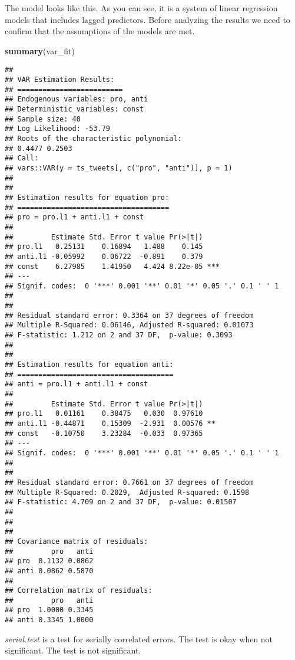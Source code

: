 \documentclass[
]{article}
\newenvironment{Shaded}{\begin{snugshade}}{\end{snugshade}}
\newcommand{\FunctionTok}[1]{\textcolor[rgb]{0.13,0.29,0.53}{\textbf{#1}}}
\newcommand{\NormalTok}[1]{#1}
\begin{document}
The model looks like this. As you can see, it is a system of linear regression models that includes lagged predictors. Before analyzing the results we need to confirm that the assumptions of the models are met.

\begin{Shaded}
\begin{Highlighting}[]
\FunctionTok{summary}\NormalTok{(var\_fit)}
\end{Highlighting}
\end{Shaded}

\begin{verbatim}
## 
## VAR Estimation Results:
## ========================= 
## Endogenous variables: pro, anti 
## Deterministic variables: const 
## Sample size: 40 
## Log Likelihood: -53.79 
## Roots of the characteristic polynomial:
## 0.4477 0.2503
## Call:
## vars::VAR(y = ts_tweets[, c("pro", "anti")], p = 1)
## 
## 
## Estimation results for equation pro: 
## ==================================== 
## pro = pro.l1 + anti.l1 + const 
## 
##         Estimate Std. Error t value Pr(>|t|)    
## pro.l1   0.25131    0.16894   1.488    0.145    
## anti.l1 -0.05992    0.06722  -0.891    0.379    
## const    6.27985    1.41950   4.424 8.22e-05 ***
## ---
## Signif. codes:  0 '***' 0.001 '**' 0.01 '*' 0.05 '.' 0.1 ' ' 1
## 
## 
## Residual standard error: 0.3364 on 37 degrees of freedom
## Multiple R-Squared: 0.06146, Adjusted R-squared: 0.01073 
## F-statistic: 1.212 on 2 and 37 DF,  p-value: 0.3093 
## 
## 
## Estimation results for equation anti: 
## ===================================== 
## anti = pro.l1 + anti.l1 + const 
## 
##         Estimate Std. Error t value Pr(>|t|)   
## pro.l1   0.01161    0.38475   0.030  0.97610   
## anti.l1 -0.44871    0.15309  -2.931  0.00576 **
## const   -0.10750    3.23284  -0.033  0.97365   
## ---
## Signif. codes:  0 '***' 0.001 '**' 0.01 '*' 0.05 '.' 0.1 ' ' 1
## 
## 
## Residual standard error: 0.7661 on 37 degrees of freedom
## Multiple R-Squared: 0.2029,  Adjusted R-squared: 0.1598 
## F-statistic: 4.709 on 2 and 37 DF,  p-value: 0.01507 
## 
## 
## 
## Covariance matrix of residuals:
##         pro   anti
## pro  0.1132 0.0862
## anti 0.0862 0.5870
## 
## Correlation matrix of residuals:
##         pro   anti
## pro  1.0000 0.3345
## anti 0.3345 1.0000
\end{verbatim}

\emph{serial.test} is a test for serially correlated errors. The test is okay when not significant. The test is not significant.
\end{document}
